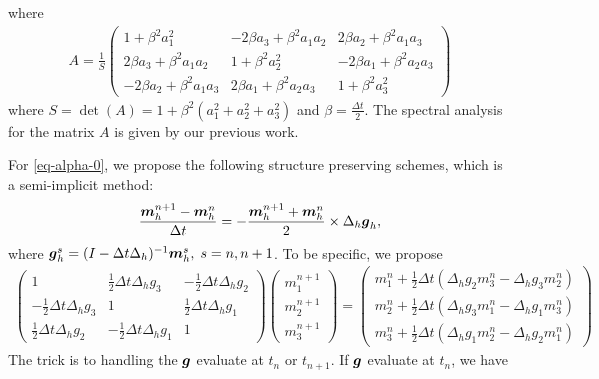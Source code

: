 \documentclass[preprint,times,3p]{elsarticle}
\def\g{\mbox{\boldmath $g$}}
\def\m{\mbox{\boldmath $m$}}
\begin{document}
where 
\begin{align*}
	A=\frac{1}{S}\begin{pmatrix}
	1+\beta^{2}a_1^{2}&-2\beta a_3+\beta^{2}a_1a_2&2\beta a_2+\beta^{2}a_1a_3\\
	2\beta a_3+\beta^{2}a_1a_2&1+\beta^{2}a_2^{2}&-2\beta a_1+\beta^{2}a_2a_3\\
	-2\beta a_2+\beta^{2}a_1a_3&2\beta a_1+\beta^{2}a_2a_3&1+\beta^{2}a_3^{2}
	\end{pmatrix}
\end{align*}
where $S=\det(A)=1+\beta^2(a_1^2+a_2^2+a_3^2)$ and $\beta=\frac{\Delta t}{2}$. The spectral analysis for the matrix $A$ is given by our previous work.

For \cref{eq-alpha-0}, we propose the following structure preserving schemes, which is a semi-implicit method:
	\begin{align}\label{eq-CN_4}
	\frac{\m_h^{n+1}-\m_h^n}{\Delta t}=-\frac{\m_h^{n+1}+\m_h^n}{2} \times \Delta_h \g_h,
	\end{align}
	where $\g_h^{s}=(I-\Delta t \Delta_h)^{-1}\m_h^s,\; s=n,n+1$. To be specific, we propose
	\begin{align*}
	\begin{pmatrix}
	1&\frac12 \Delta t \Delta_hg_3&-\frac12 \Delta t \Delta_hg_2\\
	-\frac12 \Delta t\Delta_hg_3&1&\frac12 \Delta t\Delta_hg_1\\
	\frac12 \Delta t\Delta_hg_2&-\frac12 \Delta t\Delta_h g_1&1
	\end{pmatrix}\begin{pmatrix}
	m_1^{n+1}\\
	m_2^{n+1}\\
	m_3^{n+1}
	\end{pmatrix}=\begin{pmatrix}
	m_1^n+\frac12 \Delta t(\Delta_hg_2 m_3^n-\Delta_hg_3 m_2^n)\\
	m_2^n+\frac12 \Delta t(\Delta_hg_3 m_1^n-\Delta_hg_1 m_3^n)\\
	m_3^n+\frac12 \Delta t(\Delta_hg_1m_2^n-\Delta_hg_2 m_1^n)
	\end{pmatrix}
	\end{align*}
	The trick is to handling the $\g$ evaluate at $t_n$ or $t_{n+1}$. If $\g$ evaluate at $t_n$, we have
\end{document}
